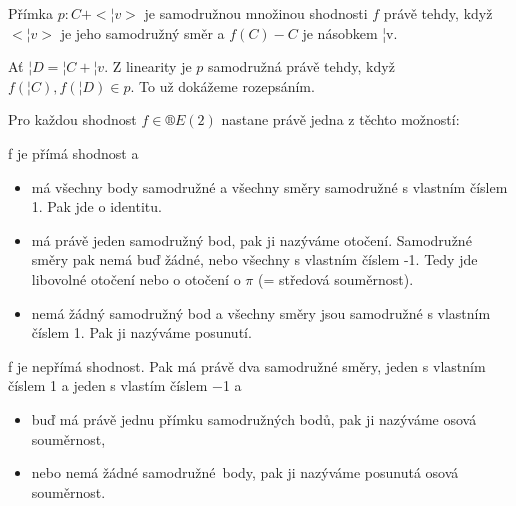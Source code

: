 \documentclass[12pt]{article}					%
\begin{document}
\begin{lemma}
	Přímka $p: C + <¦v>$ je samodružnou množinou shodnosti $f$ právě tehdy, když $<¦v>$ je jeho samodružný směr a $f(C) - C$ je násobkem ¦v.

	\begin{dukazin}
		Ať $¦D = ¦C + ¦v$. Z linearity je $p$ samodružná právě tehdy, když $f(¦C), f(¦D) \in p$. To už dokážeme rozepsáním.
	\end{dukazin}
\end{lemma}

\begin{veta}
	Pro každou shodnost $f \in ®E(2)$ nastane právě jedna z těchto možností:

	f je přímá shodnost a
	\begin{itemize}
		\item má všechny body samodružné a všechny směry samodružné s vlastním číslem 1. Pak jde o identitu.
		\item má právě jeden samodružný bod, pak ji nazýváme otočení. Samodružné směry pak nemá buď žádné, nebo všechny s vlastním číslem -1. Tedy jde libovolné otočení nebo o otočení o $\pi$ (= středová souměrnost).
		\item nemá žádný samodružný bod a všechny směry jsou samodružné s vlastním číslem 1. Pak ji nazýváme posunutí.
	\end{itemize}

	f je nepřímá shodnost. Pak má právě dva samodružné směry, jeden s vlastním číslem 1 a jeden s vlastím číslem −1 a
	\begin{itemize}
		\item buď má právě jednu přímku samodružných bodů, pak ji nazýváme osová souměrnost,
		\item nebo nemá žádné samodružné body, pak ji nazýváme posunutá osová souměrnost.
	\end{itemize}
\end{veta}
\end{document}
